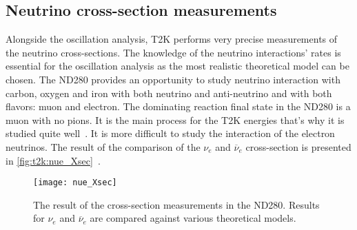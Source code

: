 \documentclass[../main.tex]{subfiles}
\begin{document}
\subsection{Neutrino cross-section measurements}
Alongside the oscillation analysis, T2K performs very precise measurements of the neutrino cross-sections. The knowledge of the neutrino interactions' rates is essential for the oscillation analysis as the most realistic theoretical model can be chosen. The ND280 provides an opportunity to study neutrino interaction with carbon, oxygen and iron with both neutrino and anti-neutrino and with both flavors: muon and electron. The dominating reaction final state in the ND280 is a muon with no pions. It is the main process for the T2K energies that's why it is studied quite well~\cite{Abe2020a}. It is more difficult to study the interaction of the electron neutrinos. The result of the comparison of the $\nu_e$ and $\overline{\nu}_e$ cross-section is presented in \autoref{fig:t2k:nue_Xsec}~\cite{Abe2020}.

\begin{figure}[!ht]
  \centering
  \texttt{[image: nue\_Xsec]}
  \caption{The result of the cross-section measurements in the ND280. Results for $\nu_e$ and $\overline{\nu}_e$ are compared against various theoretical models.}
  \label{fig:t2k:nue_Xsec}
\end{figure}
\end{document}
